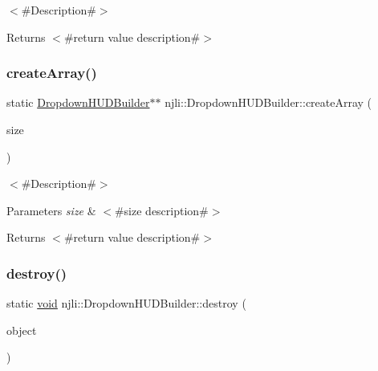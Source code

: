 $<$\#\+Description\#$>$

\begin{DoxyReturn}{Returns}
$<$\#return value description\#$>$ 
\end{DoxyReturn}
\mbox{\label{classnjli_1_1_dropdown_h_u_d_builder_a2ef0dd84f858070b1184ea83828d7154}} 
\subsubsection{\texorpdfstring{create\+Array()}{createArray()}}
{\footnotesize\ttfamily static \mbox{\hyperlink{classnjli_1_1_dropdown_h_u_d_builder}{Dropdown\+H\+U\+D\+Builder}}$\ast$$\ast$ njli\+::\+Dropdown\+H\+U\+D\+Builder\+::create\+Array (\begin{DoxyParamCaption}\item[{const \mbox{\hyperlink{_util_8h_a10e94b422ef0c20dcdec20d31a1f5049}{u32}}}]{size }\end{DoxyParamCaption})\hspace{0.3cm}{\ttfamily [static]}}

$<$\#\+Description\#$>$


\begin{DoxyParams}{Parameters}
{\em size} & $<$\#size description\#$>$\\
\hline
\end{DoxyParams}
\begin{DoxyReturn}{Returns}
$<$\#return value description\#$>$ 
\end{DoxyReturn}
\mbox{\label{classnjli_1_1_dropdown_h_u_d_builder_a3753bf65cad6ab930b901f9a8ef5e4a9}} 
\subsubsection{\texorpdfstring{destroy()}{destroy()}}
{\footnotesize\ttfamily static \mbox{\hyperlink{_thread_8h_af1e856da2e658414cb2456cb6f7ebc66}{void}} njli\+::\+Dropdown\+H\+U\+D\+Builder\+::destroy (\begin{DoxyParamCaption}\item[{\mbox{\hyperlink{classnjli_1_1_dropdown_h_u_d_builder}{Dropdown\+H\+U\+D\+Builder}} $\ast$}]{object }\end{DoxyParamCaption})\hspace{0.3cm}{\ttfamily [static]}}

